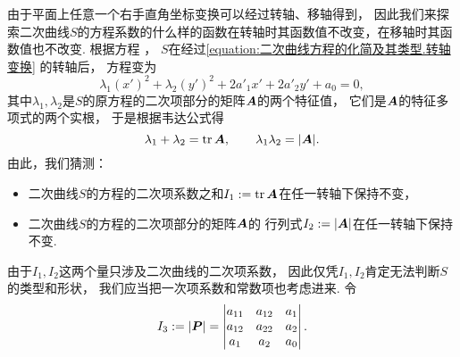 由于平面上任意一个右手直角坐标变换可以经过转轴、移轴得到，
因此我们来探索二次曲线\(S\)的方程系数的什么样的函数在转轴时其函数值不改变，在移轴时其函数值也不改变.
根据方程 ，
\(S\)在经过\cref{equation:二次曲线方程的化简及其类型.转轴变换} 的转轴后，
方程变为\begin{equation*}
	\lambda_1 (x')^2 + \lambda_2 (y')^2 + 2 a'_1 x' + 2 a'_2 y' + a_ 0 = 0,
\end{equation*}
其中\(\lambda_1,\lambda_2\)是\(S\)的原方程的二次项部分的矩阵\(\boldsymbol{A}\)的两个特征值，
它们是\(\boldsymbol{A}\)的特征多项式的两个实根，
于是根据韦达公式得\begin{equation*}
	\lambda_1 + \lambda_2 = \tr\boldsymbol{A},
	\qquad
	\lambda_1 \lambda_2 = \abs{\boldsymbol{A}}.
\end{equation*}
由此，我们猜测：\begin{itemize}
	\item 二次曲线\(S\)的方程的二次项系数之和\(I_1 := \tr\boldsymbol{A}\)在任一转轴下保持不变，
	\item 二次曲线\(S\)的方程的二次项部分的矩阵\(\boldsymbol{A}\)的
	行列式\(I_2 := \abs{\boldsymbol{A}}\)在任一转轴下保持不变.
\end{itemize}

由于\(I_1,I_2\)这两个量只涉及二次曲线的二次项系数，
因此仅凭\(I_1,I_2\)肯定无法判断\(S\)的类型和形状，
我们应当把一次项系数和常数项也考虑进来.
令\begin{equation*}
	I_3 := \abs{\boldsymbol{P}}
	= \begin{vmatrix}
		a_{11} & a_{12} & a_1 \\
		a_{12} & a_{22} & a_2 \\
		a_1 & a_2 & a_0
	\end{vmatrix}.
\end{equation*}

